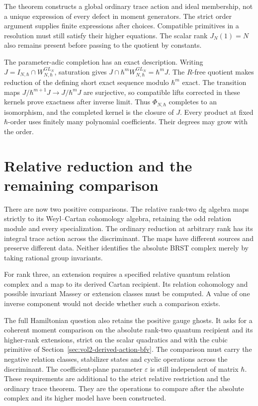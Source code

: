 The theorem constructs a global ordinary trace action and
ideal membership, not a unique expression of every defect
in moment generators. The strict order argument supplies
finite expressions after choices. Compatible primitives
in a resolution must still satisfy their higher equations.
The scalar rank $J_N(1)=N$ also remains present before
passing to the quotient by constants.

The parameter-adic completion has an exact description.
Writing $J=I_{N,\hbar}\cap W_{N,\hbar}^{GL_N}$,
saturation gives
$J\cap\hbar^mW_{N,\hbar}^{GL_N}=\hbar^mJ$.
The $R$-free quotient makes reduction of the defining
short exact sequence modulo $\hbar^m$ exact.
The transition maps $J/\hbar^{m+1}J\to J/\hbar^mJ$ are
surjective, so compatible lifts corrected in these
kernels prove exactness after inverse limit.
Thus $\Phi_{N,\hbar}$ completes to an isomorphism, and
the completed kernel is the closure of $J$.
Every product at fixed $\hbar$-order uses finitely many
polynomial coefficients. Their degrees may grow with
the order.

\clearpage
\section{Relative reduction and the remaining comparison}
\label{sec:vol2-relative-reduction-comparison}

There are now two positive comparisons.
The relative rank-two dg algebra maps strictly to
its Weyl--Cartan cohomology algebra, retaining the odd
relation module and every specialization.
The ordinary reduction at arbitrary rank has its
integral trace action across the discriminant.
The maps have different sources and preserve different
data. Neither identifies the absolute BRST complex
merely by taking rational group invariants.

For rank three, an extension requires a specified
relative quantum relation complex and a map to its
derived Cartan recipient.
Its relation cohomology and possible invariant
Massey or extension classes must be computed.
A value of one inverse component would not decide
whether such a comparison exists.

The full Hamiltonian question also retains the positive
gauge ghosts. It asks for a coherent moment comparison
on the absolute rank-two quantum recipient and its
higher-rank extensions, strict on the scalar
quadratics and with the cubic primitive of
Section~\ref{sec:vol2-derived-action-bfv}.
The comparison must carry the negative relation classes,
stabilizer states and cyclic operations across the
discriminant. The coefficient-plane parameter
$\varepsilon$ is still independent of matrix $\hbar$.
These requirements are additional to the strict relative
restriction and the ordinary trace theorem.
They are the operations to compare after the absolute
complex and its higher model have been constructed.
